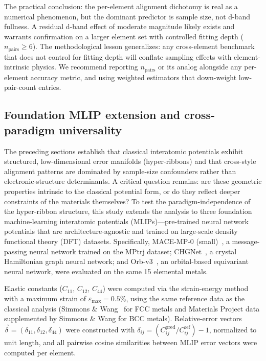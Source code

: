 \documentclass[twocolumn,9pt]{extarticle}
\begin{document}
The practical conclusion: the per-element alignment dichotomy is real as a numerical phenomenon, but the dominant predictor is sample size, not d-band fullness. A residual d-band effect of moderate magnitude likely exists and warrants confirmation on a larger element set with controlled fitting depth ($n_{\text{pairs}} \geq 6$). The methodological lesson generalizes: any cross-element benchmark that does not control for fitting depth will conflate sampling effects with element-intrinsic physics. We recommend reporting $n_{\text{pairs}}$ or its analog alongside any per-element accuracy metric, and using weighted estimators that down-weight low-pair-count entries.

\subsection{Foundation MLIP extension and cross-paradigm universality}
\label{subsec:foundation_mlip}

The preceding sections establish that classical interatomic potentials exhibit structured, low-dimensional error manifolds (hyper-ribbons) and that cross-style alignment patterns are dominated by sample-size confounders rather than electronic-structure determinants. A critical question remains: are these geometric properties intrinsic to the classical potential form, or do they reflect deeper constraints of the materials themselves? To test the paradigm-independence of the hyper-ribbon structure, this study extends the analysis to three foundation machine-learning interatomic potentials (MLIPs)---pre-trained neural network potentials that are architecture-agnostic and trained on large-scale density functional theory (DFT) datasets. Specifically, MACE-MP-0 (small)~\cite{batzner2022}, a message-passing neural network trained on the MPtrj dataset; CHGNet~\cite{deng2023}, a crystal Hamiltonian graph neural network; and Orb-v3~\cite{kolluru2024}, an orbital-based equivariant neural network, were evaluated on the same 15 elemental metals.

Elastic constants ($C_{11}$, $C_{12}$, $C_{44}$) were computed via the strain-energy method with a maximum strain of $\varepsilon_{\max} = 0.5\%$, using the same reference data as the classical analysis (Simmons \& Wang~\cite{simmons1971} for FCC metals and Materials Project data supplemented by Simmons \& Wang for BCC metals). Relative-error vectors $\vec{\delta} = (\delta_{11}, \delta_{12}, \delta_{44})$ were constructed with $\delta_{ij} = (C_{ij}^{\text{pred}} / C_{ij}^{\text{ref}}) - 1$, normalized to unit length, and all pairwise cosine similarities between MLIP error vectors were computed per element.
\end{document}
